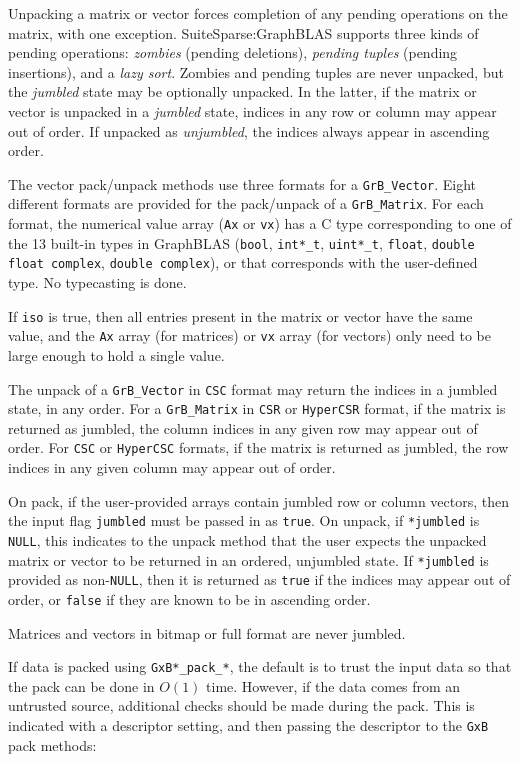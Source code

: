 \documentclass[12pt]{article}
\begin{document}
Unpacking a matrix or vector forces completion of any pending
operations on the matrix, with one exception.  SuiteSparse:GraphBLAS supports
three kinds of pending operations: {\em zombies} (pending deletions), {\em
pending tuples} (pending insertions), and a {\em lazy sort}.  Zombies and
pending tuples are never unpacked, but the {\em jumbled} state may be
optionally unpacked.  In the latter, if the matrix or vector is unpacked in a
{\em jumbled} state, indices in any row or column may appear out of order.  If
unpacked as {\em unjumbled}, the indices always appear in ascending order.

The vector pack/unpack methods use three formats for a
\verb'GrB_Vector'.  Eight different formats are provided for the
pack/unpack of a \verb'GrB_Matrix'.  For each format, the
numerical value array (\verb'Ax' or \verb'vx') has a C type corresponding to
one of the 13 built-in types in GraphBLAS (\verb'bool', \verb'int*_t',
\verb'uint*_t', \verb'float', \verb'double' \verb'float complex', \verb'double complex'),
or that corresponds with the user-defined type.  No typecasting is
done.

If \verb'iso' is true, then all entries present in the matrix or vector
have the same value, and the \verb'Ax' array (for matrices) or \verb'vx' array
(for vectors) only need to be large enough to hold a single value.

The unpack of a \verb'GrB_Vector' in \verb'CSC' format may return the
indices in a jumbled state, in any order.
For a \verb'GrB_Matrix' in \verb'CSR' or \verb'HyperCSR' format, if the matrix
is returned as jumbled, the column indices in any given row may appear out of
order.  For \verb'CSC' or \verb'HyperCSC' formats, if the matrix is returned as
jumbled, the row indices in any given column may appear out of order.

On pack, if the user-provided arrays contain jumbled row or column vectors,
then the input flag \verb'jumbled' must be passed in as \verb'true'.  On
unpack, if \verb'*jumbled' is \verb'NULL', this indicates to the unpack method
that the user expects the unpacked matrix or vector to be returned in an
ordered, unjumbled state.  If \verb'*jumbled' is provided as non-\verb'NULL',
then it is returned as \verb'true' if the indices may appear out of order, or
\verb'false' if they are known to be in ascending order.

Matrices and vectors in bitmap or full format are never jumbled.

If data is packed using
\verb'GxB*_pack_*', the default is to trust the input data so that the
pack can be done in $O(1)$ time.  However, if the data comes from an
untrusted source, additional checks should be made during the pack.  This is
indicated with a descriptor setting, and then passing the descriptor
to the \verb'GxB' pack methods:
\end{document}

